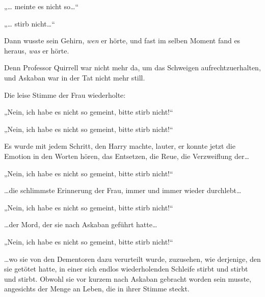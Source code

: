 „… meinte es nicht so…“

„… stirb nicht…“

Dann wusste sein Gehirn, \emph{wen} er hörte, und fast im selben Moment fand es heraus, \emph{was} er hörte.

Denn Professor Quirrell war nicht mehr da, um das Schweigen aufrechtzuerhalten, und Askaban war in der Tat nicht mehr still.

Die leise Stimme der Frau wiederholte:

„Nein, ich habe es nicht so gemeint, bitte stirb nicht!“

„Nein, ich habe es nicht so gemeint, bitte stirb nicht!“

Es wurde mit jedem Schritt, den Harry machte, lauter, er konnte jetzt die Emotion in den Worten hören, das Entsetzen, die Reue, die Verzweiflung der…

„Nein, ich habe es nicht so gemeint, bitte stirb nicht!“

…die schlimmste Erinnerung der Frau, immer und immer wieder durchlebt…

„Nein, ich habe es nicht so gemeint, bitte stirb nicht!“

…der Mord, der sie nach Askaban geführt hatte…

„Nein, ich habe es nicht so gemeint, bitte stirb nicht!“

…wo sie von den Dementoren dazu verurteilt wurde, zuzusehen, wie derjenige, den sie getötet hatte, in einer sich endlos wiederholenden Schleife stirbt und stirbt und stirbt. Obwohl sie vor kurzem nach Askaban gebracht worden sein musste, angesichts der Menge an Leben, die in ihrer Stimme steckt.

